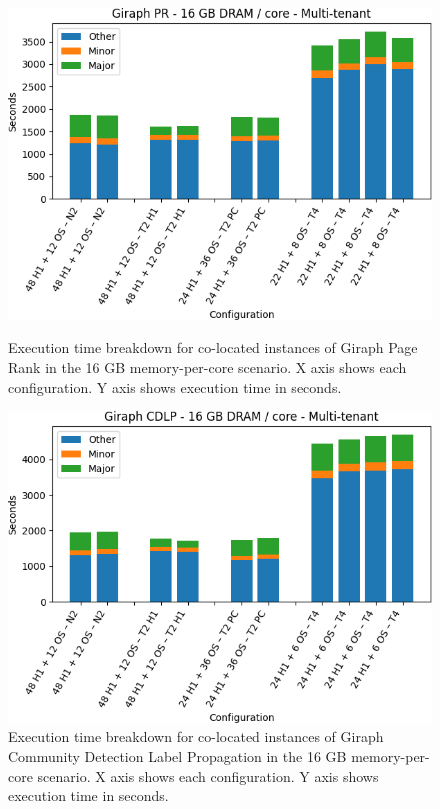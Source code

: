 \begin{figure}[thbp]
        \centering
    \includegraphics[width=\linewidth]{./fig/g_pr128.png}
    \caption{Execution time breakdown for co-located instances of Giraph
    Page Rank in the 16 GB memory-per-core scenario. X axis shows each configuration.
	Y axis shows execution time in seconds.}
    \label{fig:g_pr128}
    \includegraphics[width=\linewidth]{./fig/g_cdlp128.png}
    \caption{Execution time breakdown for co-located instances of Giraph
    Community Detection Label Propagation in the 16 GB memory-per-core scenario. X axis shows each configuration. Y axis shows execution
	time in seconds.}
    \label{fig:g_cdlp128}
\end{figure}

